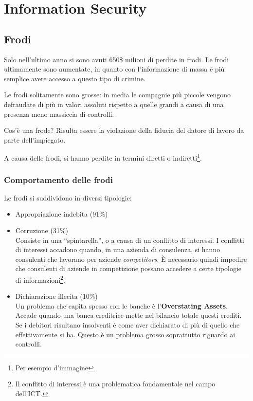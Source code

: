 \part{Information Security}

\chapter{Frodi}
\label{Frodi}

Solo nell'ultimo anno si sono avuti 650\$ milioni di perdite in frodi. Le frodi
ultimamente sono aumentate, in quanto con l'informazione di massa è più
semplice avere accesso a questo tipo di crimine.

Le frodi solitamente sono grosse: in media le compagnie più piccole vengono
defraudate di più in valori assoluti rispetto a quelle grandi a causa di una presenza
meno massiccia di controlli.

Cos'è una frode? Risulta essere la violazione della fiducia del
datore di lavoro da parte dell'impiegato.

A causa delle frodi, si hanno perdite in termini diretti o 
indiretti\footnote{Per esempio d'immagine}.

\section{Comportamento delle frodi}

Le frodi si suddividono in diversi tipologie:

\begin{itemize}
  \item Appropriazione indebita (91\%)
  \item Corruzione (31\%) \\
  Consiste in una ``spintarella'', o a causa di un conflitto di interessi. I
  conflitti di interessi accadono quando, in una azienda di consulenza, si
  hanno consulenti che lavorano per aziende \textit{competitors}. È necessario
  quindi impedire che consulenti di aziende in competizione possano accedere a
  certe tipologie di informazioni\footnote{Il conflitto di interessi è una
  problematica fondamentale nel campo dell'ICT.}.
  \item Dichiarazione illecita (10\%) \\
  Un problema che capita spesso con le banche è l'\textbf{Overstating Assets}.
  Accade quando una banca creditrice mette nel bilancio totale questi crediti.
  Se i debitori risultano insolventi è come aver dichiarato di più di quello
  che effettivamente si ha. Questo è un problema grosso soprattutto riguardo ai
  controlli.
\end{itemize}
